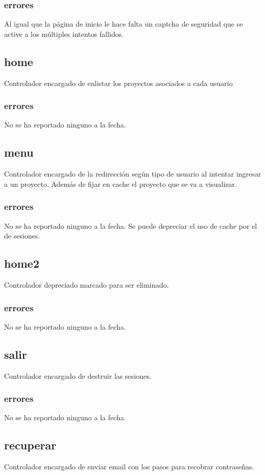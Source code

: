 \documentclass[10pt,a4paper]{book}
\begin{document}
	\subsubsection{errores}
	Al igual que la página de inicio le hace falta un captcha de seguridad que se active a los múltiples intentos fallidos.
	
	\subsection{home}
	Controlador encargado de enlistar los proyectos asociados a cada usuario
	\subsubsection{errores}
	No se ha reportado ninguno a la fecha.
	
	\subsection{menu}
	Controlador encargado de la redirección según tipo de usuario al intentar ingresar a un proyecto. Además de fijar en cache el proyecto que se va a visualizar.
	\subsubsection{errores}
	No se ha reportado ninguno a la fecha. Se puede depreciar el uso de cache por el de sesiones.

	\subsection{home2}
	Controlador depreciado marcado para ser eliminado.
	\subsubsection{errores}
	No se ha reportado ninguno a la fecha.
		
	\subsection{salir}
	Controlador encargado de destruir las sesiones.
	\subsubsection{errores}
	No se ha reportado ninguno a la fecha.
	
	\subsection{recuperar}\label{recuperar}
	Controlador encargado de enviar email con los pasos para recobrar contraseñas.
\end{document}
